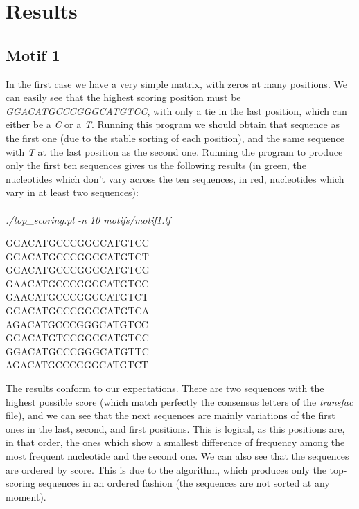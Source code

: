 \documentclass{article}
\newcommand{\spaces}{\space\space\space\space\space\space}
\newcommand{\g}[1]{\textcolor[rgb]{0,0.6,0}{#1}}
\newcommand{\re}[1]{\textcolor[rgb]{0.6,0,0}{#1}}
\begin{document}
\section{Results} \label{results}



\subsection{Motif 1}

In the first case we have a very simple matrix, with zeros at many positions. We can easily see that the highest scoring position must be \emph{GGACATGCCCGGGCATGTCC}, with only a tie in the last position, which can either be a \emph{C} or a \emph{T}. Running this program we should obtain that sequence as the first one (due to the stable sorting of each position), and the same sequence with \emph{T} at the last position as the second one. Running the program to produce only the first ten sequences gives us the following results (in green, the nucleotides which don't vary across the ten sequences, in red, nucleotides which vary in at least two sequences):\\\\
\emph{./top\_scoring.pl -n 10 motifs/motif1.tf}
\begin{center}
\re{GG}\g{ACATG}C\g{CCGGGCATGT}C\re{C}\spaces307\\
\re{GG}\g{ACATG}C\g{CCGGGCATGT}C\re{T}\spaces307\\
\re{GG}\g{ACATG}C\g{CCGGGCATGT}C\re{G}\spaces302\\
\re{GA}\g{ACATG}C\g{CCGGGCATGT}C\re{C}\spaces300\\
\re{GA}\g{ACATG}C\g{CCGGGCATGT}C\re{T}\spaces300\\
\re{GG}\g{ACATG}C\g{CCGGGCATGT}C\re{A}\spaces300\\
\re{AG}\g{ACATG}C\g{CCGGGCATGT}C\re{C}\spaces298\\
\re{GG}\g{ACATG}T\g{CCGGGCATGT}C\re{C}\spaces298\\
\re{GG}\g{ACATG}C\g{CCGGGCATGT}T\re{C}\spaces298\\
\re{AG}\g{ACATG}C\g{CCGGGCATGT}C\re{T}\spaces298\\
\end{center}

The results conform to our expectations. There are two sequences with the highest possible score (which match perfectly the consensus letters of the \emph{transfac} file), and we can see that the next sequences are mainly variations of the first ones in the last, second, and first positions. This is logical, as this positions are, in that order, the ones which show a smallest difference of frequency among the most frequent nucleotide and the second one. We can also see that the sequences are ordered by score. This is due to the algorithm, which produces only the top-scoring sequences in an ordered fashion (the sequences are not sorted at any moment).
\\
\end{document}
